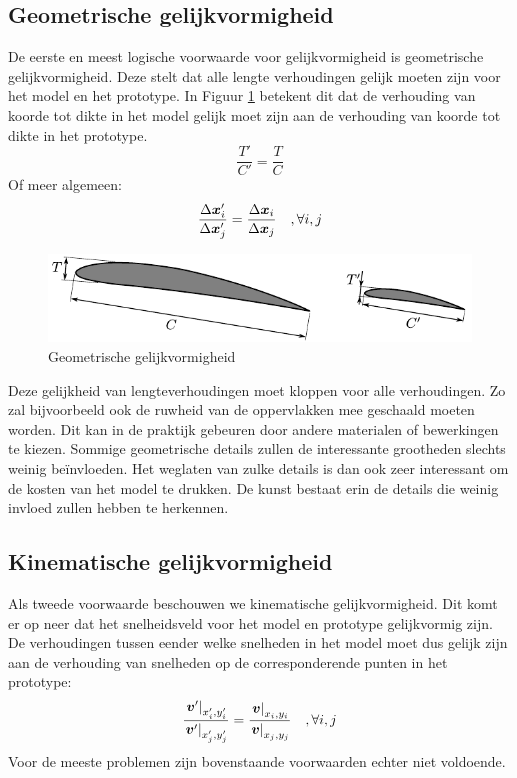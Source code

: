 		\subsection{Geometrische gelijkvormigheid}
De eerste en meest logische voorwaarde voor gelijkvormigheid is geometrische gelijkvormigheid. Deze stelt dat alle lengte verhoudingen gelijk moeten zijn voor het model en het prototype. In Figuur \ref{fig:geometrische gelijkvormigheid} betekent dit dat de verhouding van koorde tot dikte in het model gelijk moet zijn aan de verhouding van koorde tot dikte in het prototype.
\begin{equation}
	\dfrac{T'}{C'} = \dfrac{T}{C}
	\label{eqn:geometrische gelijkvormigheid vleugel}
\end{equation}
Of meer algemeen:
\begin{equation}
	\dfrac{\Delta \boldsymbol{x}_i'}{\Delta \boldsymbol{x}_j'} = \dfrac{\Delta \boldsymbol{x}_i}{\Delta \boldsymbol{x}_j} \quad, \forall i,j
	\label{eqn:geometrische gelijkvormigheid}
\end{equation}
\begin{figure}[htb]
	\centering
	\includegraphics{fig/gelijkvormigheid/Geometrische_gelijkvormigheid}
	\caption{Geometrische gelijkvormigheid}
	\label{fig:geometrische gelijkvormigheid}
\end{figure}
Deze gelijkheid van lengteverhoudingen moet kloppen voor alle verhoudingen. Zo zal bijvoorbeeld ook de ruwheid van de oppervlakken mee geschaald moeten worden. Dit kan in de praktijk gebeuren door andere materialen of bewerkingen te kiezen. Sommige geometrische details zullen de interessante grootheden slechts weinig beïnvloeden. Het weglaten van zulke details is dan ook zeer interessant om de kosten van het model te drukken. De kunst bestaat erin de details die weinig invloed zullen hebben te herkennen.
	\subsection{Kinematische gelijkvormigheid}
Als tweede voorwaarde beschouwen we kinematische gelijkvormigheid. Dit komt er op neer dat het snelheidsveld voor het model en prototype gelijkvormig zijn. De verhoudingen tussen eender welke snelheden in het model moet dus gelijk zijn aan de verhouding van snelheden op de corresponderende punten in het prototype:
\begin{equation}
	\dfrac{\left. \boldsymbol{v}' \right|_{x_i',y_i'}}{\left. \boldsymbol{v}' \right|_{x_j',y_j'}} = \dfrac{\left. \boldsymbol{v} \right|_{x_i,y_i}}{\left. \boldsymbol{v} \right|_{x_j,y_j}} \quad, \forall i,j
	\label{eqn:kinematische gelijkvormigheid}
\end{equation}
Voor de meeste problemen zijn bovenstaande voorwaarden echter niet voldoende.
